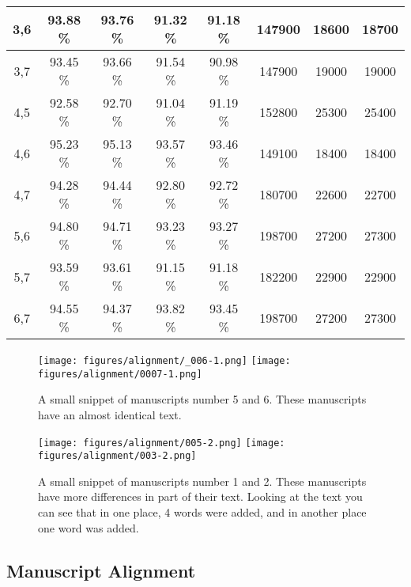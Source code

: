 \documentclass[10pt, a4paper, conference, compsocconf]{IEEEtran}
\begin{document}
\begin{table*}[t]
\begin{tabular}{| c | c | c | c | c | c | c | c |}
3,6	&			93.88	\%&	93.76	\%&			91.32	\%&	91.18	\%&	147900	&	18600	&	18700	\\ \hline
3,7	&			93.45	\%&	93.66	\%&			91.54	\%&	90.98	\%&	147900	&	19000	&	19000	\\ \hline
4,5	&			92.58	\%&	92.70	\%&			91.04	\%&	91.19	\%&	152800	&	25300	&	25400	\\ \hline
4,6	&			95.23	\%&	95.13	\%&			93.57	\%&	93.46	\%&	149100	&	18400	&	18400	\\ \hline
4,7	&			94.28	\%&	94.44	\%&			92.80	\%&	92.72	\%&	180700	&	22600	&	22700	\\ \hline
5,6	&			94.80	\%&	94.71	\%&			93.23	\%&	93.27	\%&	198700	&	27200	&	27300	\\ \hline
5,7	&			93.59	\%&	93.61	\%&			91.15	\%&	91.18	\%&	182200	&	22900	&	22900	\\ \hline
6,7	&			94.55	\%&	94.37	\%&			93.82	\%&	93.45	\%&	198700	&	27200	&	27300	\\ \hline

	
		
	\end{tabular}
	\label{table:training}
\end{table*}\begin{figure}
	\texttt{[image: figures/alignment/\_006-1.png]}
		\texttt{[image: figures/alignment/0007-1.png]}
	\caption{A small snippet of manuscripts number 5 and 6. These manuscripts have an almost identical text.}
	\label{figure:manuscripts56}
\end{figure}\begin{figure}
	\texttt{[image: figures/alignment/005-2.png]}
	\texttt{[image: figures/alignment/003-2.png]}
	\caption{A small snippet of manuscripts number 1 and 2. These manuscripts have more differences in part of their text. Looking at the text you can see that in one place, 4 words were added, and in another place one word was added.}
	\label{figure:manuscripts12}
\end{figure}\subsection{Manuscript Alignment}
\end{document}
